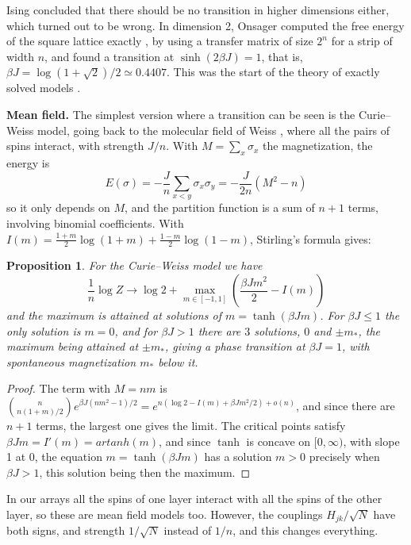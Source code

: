 \documentclass[11pt,a4paper]{article}
\newtheorem{prop}[thm]{Proposition}
\theoremstyle{remark}
\begin{document}
Ising concluded that there should be no transition in higher dimensions either, which turned out to be wrong. In dimension 2, Onsager computed the free energy of the square lattice exactly \cite{ons}, by using a transfer matrix of size $2^n$ for a strip of width $n$, and found a transition at $\sinh(2\beta J)=1$, that is, $\beta J=\log(1+\sqrt2)/2\simeq0.4407$. This was the start of the theory of exactly solved models \cite{bax}.

\medskip

\noindent\textbf{Mean field.} The simplest version where a transition can be seen is the Curie--Weiss model, going back to the molecular field of Weiss \cite{wei}, where all the pairs of spins interact, with strength $J/n$. With $M=\sum_x\sigma_x$ the magnetization, the energy is
\[
 E(\sigma)=-\frac{J}{n}\sum_{x<y}\sigma_x\sigma_y=-\frac{J}{2n}(M^2-n)
\]
so it only depends on $M$, and the partition function is a sum of $n+1$ terms, involving binomial coefficients. With $I(m)=\frac{1+m}{2}\log(1+m)+\frac{1-m}{2}\log(1-m)$, Stirling's formula gives:

\begin{samepage}
\begin{prop}\label{prop:cw}
For the Curie--Weiss model we have
\[
 \frac{1}{n}\log Z\to\log2+\max_{m\in[-1,1]}\left(\frac{\beta Jm^2}{2}-I(m)\right)
\]
and the maximum is attained at solutions of $m=\tanh(\beta Jm)$. For $\beta J\leq1$ the only solution is $m=0$, and for $\beta J>1$ there are $3$ solutions, $0$ and $\pm m_*$, the maximum being attained at $\pm m_*$, giving a phase transition at $\beta J=1$, with spontaneous magnetization $m_*$ below it.
\end{prop}
\end{samepage}

\begin{proof}
The term with $M=nm$ is $\binom{n}{n(1+m)/2}e^{\beta J(nm^2-1)/2}=e^{n(\log2-I(m)+\beta Jm^2/2)+o(n)}$, and since there are $n+1$ terms, the largest one gives the limit. The critical points satisfy $\beta Jm=I'(m)=artanh(m)$, and since $\tanh$ is concave on $[0,\infty)$, with slope 1 at 0, the equation $m=\tanh(\beta Jm)$ has a solution $m>0$ precisely when $\beta J>1$, this solution being then the maximum.
\end{proof}

In our arrays all the spins of one layer interact with all the spins of the other layer, so these are mean field models too. However, the couplings $H_{jk}/\sqrt N$ have both signs, and strength $1/\sqrt N$ instead of $1/n$, and this changes everything.
\end{document}
